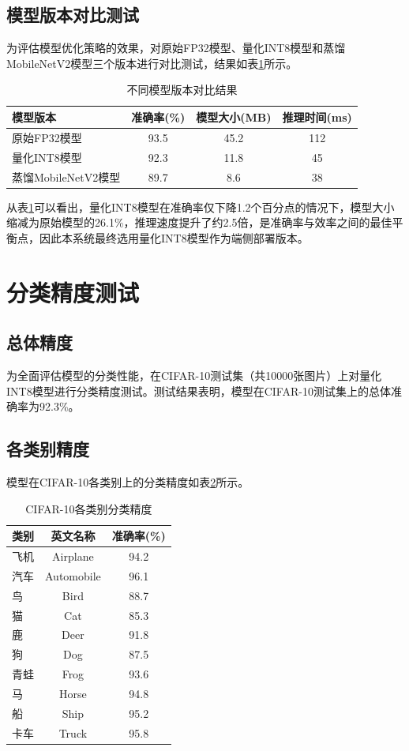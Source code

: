 \subsection{模型版本对比测试}

为评估模型优化策略的效果，对原始FP32模型、量化INT8模型和蒸馏MobileNetV2模型三个版本进行对比测试，结果如表\ref{tab:model-compare}所示。

\begin{table}[htbp]
\centering
\caption{不同模型版本对比结果}
\label{tab:model-compare}
\begin{tabular}{lccc}
\toprule
模型版本 & 准确率(\%) & 模型大小(MB) & 推理时间(ms) \\
\midrule
原始FP32模型 & 93.5 & 45.2 & 112 \\
量化INT8模型 & 92.3 & 11.8 & 45 \\
蒸馏MobileNetV2模型 & 89.7 & 8.6 & 38 \\
\bottomrule
\end{tabular}
\end{table}

从表\ref{tab:model-compare}可以看出，量化INT8模型在准确率仅下降1.2个百分点的情况下，模型大小缩减为原始模型的26.1\%，推理速度提升了约2.5倍，是准确率与效率之间的最佳平衡点，因此本系统最终选用量化INT8模型作为端侧部署版本。

\section{分类精度测试}

\subsection{总体精度}

为全面评估模型的分类性能，在CIFAR-10测试集（共10000张图片）上对量化INT8模型进行分类精度测试。测试结果表明，模型在CIFAR-10测试集上的总体准确率为92.3\%。

\subsection{各类别精度}

模型在CIFAR-10各类别上的分类精度如表\ref{tab:cls-acc}所示。

\begin{table}[htbp]
\centering
\caption{CIFAR-10各类别分类精度}
\label{tab:cls-acc}
\begin{tabular}{lcc}
\toprule
类别 & 英文名称 & 准确率(\%) \\
\midrule
飞机 & Airplane & 94.2 \\
汽车 & Automobile & 96.1 \\
鸟 & Bird & 88.7 \\
猫 & Cat & 85.3 \\
鹿 & Deer & 91.8 \\
狗 & Dog & 87.5 \\
青蛙 & Frog & 93.6 \\
马 & Horse & 94.8 \\
船 & Ship & 95.2 \\
卡车 & Truck & 95.8 \\
\bottomrule
\end{tabular}
\end{table}

